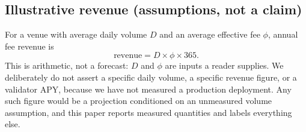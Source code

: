 \subsection{Illustrative revenue (assumptions, not a claim)}

For a venue with average daily volume $D$ and an average effective fee $\phi$, annual fee
revenue is
\[
  \text{revenue} = D \times \phi \times 365.
\]
This is arithmetic, not a forecast: $D$ and $\phi$ are inputs a reader supplies. We
deliberately do not assert a specific daily volume, a specific revenue figure, or a validator
APY, because we have not measured a production deployment. Any such figure would be a
projection conditioned on an unmeasured volume assumption, and this paper reports measured
quantities and labels everything else.
